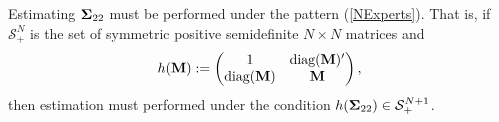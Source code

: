 \documentclass[11pt]{article}
\newcommand{\COR}{\text{COR}}
\theoremstyle{definition}
\theoremstyle{definition}
\def\bSigma{{\bf \Sigma}}
\def\M{{\bf M}}
\def\conv{\text{conv}}
\def\diag{\text{diag}}
\def\diag{\text{diag}}
\begin{document}
Estimating $\bSigma_{22}$ must be performed under the pattern (\ref{NExperts}). That is, if $\mathcal{S}_{+}^N$ is the set of  symmetric positive semidefinite $N \times N$ matrices and 
\begin{align*}
h(\M)  := 
\left(\begin{matrix} 
1 & \diag(\M)' \\
\diag(\M) &\M\\
 \end{matrix}\right),
\end{align*}
then estimation must performed under the condition $h(\bSigma_{22}) \in \mathcal{S}_{+}^{N+1}$. 
\end{document}
